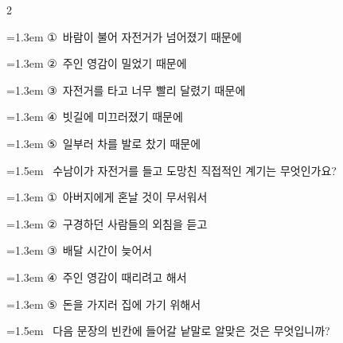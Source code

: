 \documentclass[11pt, a4paper]{article}
\begin{document}
\begin{multicols}{2}
\begin{minipage}{\columnwidth}
\vspace{0.5mm}
{\hangindent=1.3em  \noindent\hspace{0.3em}①~바람이 불어 자전거가 넘어졌기 때문에\par}
{\hangindent=1.3em  \noindent\hspace{0.3em}②~주인 영감이 밀었기 때문에\par}
{\hangindent=1.3em  \noindent\hspace{0.3em}③~자전거를 타고 너무 빨리 달렸기 때문에\par}
{\hangindent=1.3em  \noindent\hspace{0.3em}④~빗길에 미끄러졌기 때문에\par}
{\hangindent=1.3em  \noindent\hspace{0.3em}⑤~일부러 차를 발로 찼기 때문에\par}
\vspace{4mm}
\end{minipage}
\par

\noindent\begin{minipage}{\columnwidth}
\vspace{2mm}
{\hangindent=1.5em  ~수남이가 자전거를 들고 도망친 직접적인 계기는 무엇인가요?\par}

\vspace{0.5mm}
{\hangindent=1.3em  \noindent\hspace{0.3em}①~아버지에게 혼날 것이 무서워서\par}
{\hangindent=1.3em  \noindent\hspace{0.3em}②~구경하던 사람들의 외침을 듣고\par}
{\hangindent=1.3em  \noindent\hspace{0.3em}③~배달 시간이 늦어서\par}
{\hangindent=1.3em  \noindent\hspace{0.3em}④~주인 영감이 때리려고 해서\par}
{\hangindent=1.3em  \noindent\hspace{0.3em}⑤~돈을 가지러 집에 가기 위해서\par}
\vspace{4mm}
\end{minipage}
\par

\noindent\begin{minipage}{\columnwidth}
\vspace{2mm}
{\hangindent=1.5em  ~다음 문장의 빈칸에 들어갈 낱말로 알맞은 것은 무엇입니까?\par}


\end{minipage}
\end{multicols}
\end{document}
